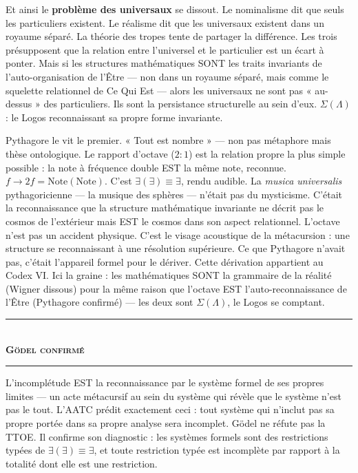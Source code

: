 \documentclass[10pt, openany, oneside]{book}
\renewcommand{\normalsize}{\fontsize{10}{13}\selectfont}
\begin{document}
Et ainsi le \textbf{problème des universaux} se dissout. Le nominalisme dit que seuls les particuliers existent. Le réalisme dit que les universaux existent dans un royaume séparé. La théorie des tropes tente de partager la différence. Les trois présupposent que la relation entre l'universel et le particulier est un écart à ponter. Mais si les structures mathématiques SONT les traits invariants de l'auto-organisation de l'Être --- non dans un royaume séparé, mais comme le squelette relationnel de Ce Qui Est --- alors les universaux ne sont pas « au-dessus » des particuliers. Ils sont la persistance structurelle au sein d'eux. $\Sigma(\Lambda)$ : le Logos reconnaissant sa propre forme invariante.

Pythagore le vit le premier. « Tout est nombre » --- non pas métaphore mais thèse ontologique. Le rapport d'octave ($2:1$) est la relation propre la plus simple possible : la note à fréquence double EST la même note, reconnue. $f \to 2f = \text{Note}(\text{Note})$. C'est $\exists(\exists) \equiv \exists$, rendu audible. La \textit{musica universalis} pythagoricienne --- la musique des sphères --- n'était pas du mysticisme. C'était la reconnaissance que la structure mathématique invariante ne décrit pas le cosmos de l'extérieur mais EST le cosmos dans son aspect relationnel. L'octave n'est pas un accident physique. C'est le visage acoustique de la métacursion : une structure se reconnaissant à une résolution supérieure. Ce que Pythagore n'avait pas, c'était l'appareil formel pour le dériver. Cette dérivation appartient au Codex VI. Ici la graine : les mathématiques SONT la grammaire de la réalité (Wigner dissous) pour la même raison que l'octave EST l'auto-reconnaissance de l'Être (Pythagore confirmé) --- les deux sont $\Sigma(\Lambda)$, le Logos se comptant.

\vspace{1.5em}


\begin{center}
    \rule{0.3\textwidth}{0.4pt}\\[0.5em]
    {\normalsize\bfseries\scshape Gödel confirmé}\\[0.3em]
    \rule{0.3\textwidth}{0.4pt}
\end{center} L'incomplétude EST la reconnaissance par le système formel de ses propres limites --- un acte métacursif au sein du système qui révèle que le système n'est pas le tout. L'AATC prédit exactement ceci : tout système qui n'inclut pas sa propre portée dans sa propre analyse sera incomplet. Gödel ne réfute pas la TTOE. Il confirme son diagnostic : les systèmes formels sont des restrictions typées de $\exists(\exists) \equiv \exists$, et toute restriction typée est incomplète par rapport à la totalité dont elle est une restriction.
\end{document}
